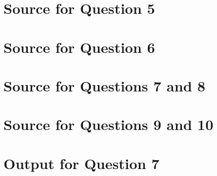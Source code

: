 \documentclass[letterpaper,11pt]{article}
\begin{document}
\clearpage
\appendix
\section{Source for Question 5}



\clearpage
\appendix
\section{Source for Question 6}



\clearpage
\appendix
\section{Source for Questions 7 and 8}



\clearpage
\appendix
\section{Source for Questions 9 and 10}



\clearpage
\appendix
\section{Output for Question 7}


\end{document}
